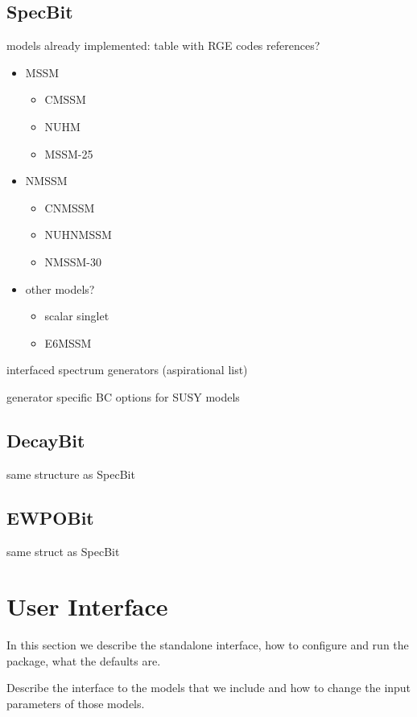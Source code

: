 \documentclass[11pt,a4paper]{article}
\begin{document}
\subsection{SpecBit}

models already implemented: table with RGE codes references?

\begin{itemize} 
\item MSSM
  \begin{itemize}
  \item CMSSM 
  \item NUHM 
  \item MSSM-25
  \end{itemize} 
\item NMSSM
  \begin{itemize}
  \item CNMSSM  
  \item NUHNMSSM 
  \item NMSSM-30
  \end{itemize}
\item other models?
  \begin{itemize}
  \item scalar singlet
  \item E6MSSM  
  \end{itemize}
\end{itemize}  

interfaced spectrum generators (aspirational list)
         
generator specific BC options for SUSY models

\subsection{DecayBit}

same structure as SpecBit

\subsection{EWPOBit}

same struct as SpecBit


\section{User Interface}

In this section we describe the standalone interface, how to configure and run the package, what the defaults are.

Describe the interface to the models that we include and how to change the input parameters of those models.
\end{document}
